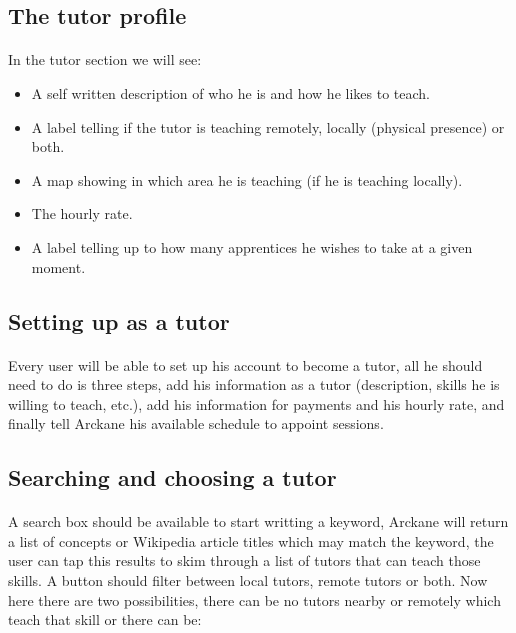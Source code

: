 \subsection{The tutor profile}
\paragraph{} In the tutor section we will see:
\begin{itemize}
  \item A self written description of who he is and how he likes to teach.
  \item A label telling if the tutor is teaching remotely, locally (physical presence) or both.
  \item A map showing in which area he is teaching (if he is teaching locally).
  \item The hourly rate.
  \item A label telling up to how many apprentices he wishes to take at a given moment.
\end{itemize}

\subsection{Setting up as a tutor}
\paragraph{} Every user will be able to set up his account to become a tutor, all he should need to do is three steps, add his information as a tutor (description, skills he is willing to teach, etc.), add his information for payments and his hourly rate, and finally tell Arckane his available schedule to appoint sessions.

\subsection{Searching and choosing a tutor}
\paragraph{} A search box should be available to start writting a keyword, Arckane will return a list of concepts or Wikipedia article titles which may match the keyword, the user can tap this results to skim through a list of tutors that can teach those skills. A button should filter between local tutors, remote tutors or both. Now here there are two possibilities, there can be no tutors nearby or remotely which teach that skill or there can be:

